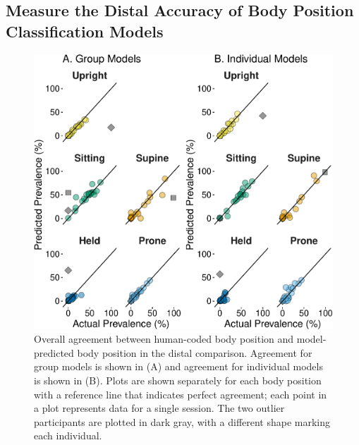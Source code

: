 \documentclass[
  man]{apa6}
\begin{document}
\hypertarget{measure-the-distal-accuracy-of-body-position-classification-models}{%
\subsection{Measure the Distal Accuracy of Body Position Classification Models}\label{measure-the-distal-accuracy-of-body-position-classification-models}}

\begin{figure}

{\centering \includegraphics{manuscript_files/figure-latex/part2overall-1} 

}

\caption{Overall agreement between human-coded body position and model-predicted body position in the distal comparison. Agreement for group models is shown in (A) and agreement for individual models is shown in (B). Plots are shown separately for each body position with a reference line that indicates perfect agreement; each point in a plot represents data for a single session. The two outlier participants are plotted in dark gray, with a different shape marking each individual. }\label{fig:part2overall}
\end{figure}
\end{document}
